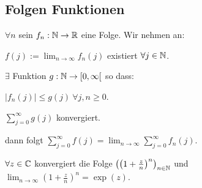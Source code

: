 \subsection{Folgen Funktionen}
$\forall n$ sein $f_n : \mathbb{N} \to \mathbb{R}$ eine Folge. Wir nehmen an:
\begin{compactenum}
    \item $f(j) := \lim_{n \to \infty} f_n(j)$ existiert $\forall j \in \mathbb{N}$.
    \item $\exists$ Funktion $g: \mathbb{N} \to [0, \infty[$ so dass:
        \begin{compactenum}[{2}.1]
            \item $\left| f_n(j) \right| \le g(j) \ \forall j,n \ge 0$.
            \item $\sum_{j=0}^{\infty} g(j)$ konvergiert.
        \end{compactenum}
\end{compactenum}
dann folgt $\sum_{j=0}^{\infty} f(j) = \lim_{n \to \infty} \sum_{j=0}^{\infty} f_n(j)$.
\begin{compactitem}
\item $\forall z \in \mathbb{C}$ konvergiert die Folge $\left( \left( 1 + \frac{z}{n} \right)^n  \right)_{n \in \mathbb{N}} $ und $\lim_{n \to \infty} \left( 1 + \frac{z}{n} \right)^n = \exp(z)$.
\end{compactitem}

